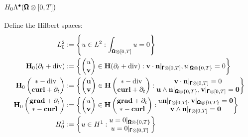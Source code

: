         \subsection*{$H_{0}\Lambda^{\bullet}(\pmb{\mathsf{\Omega}}\otimes[0, T])$}
            Define the Hilbert spaces: 
            \begin{align}
                L^{2}_{0}  &:=  \left\{u \in L^{2} : \int_{\pmb{\mathsf{\Omega}}\otimes[0, T]}u = 0\right\}  \\
                \mathbf{H}_{0}(\partial_{t} + \mathrm{div})  &:=  \left\{\begin{pmatrix} u \\ \mathbf{v} \end{pmatrix} \in \mathbf{H}(\partial_{t} + \mathrm{div}) : \mathbf{v}\cdot\mathbf{n}|_{\pmb{\mathsf{\Gamma}}\otimes[0, T]}, u|_{\pmb{\mathsf{\Omega}}\otimes\{0, T\}} = 0\right\}  \\
                \mathbf{H}_{0}\left(\begin{matrix} * - \mathrm{div} \\ \mathbf{curl} + \partial_{t} \end{matrix}\right)  &:=  \left\{\begin{pmatrix} \mathbf{u} \\ \mathbf{v} \end{pmatrix} \in \mathbf{H}\left(\begin{matrix} * - \mathrm{div} \\ \mathbf{curl} + \partial_{t} \end{matrix}\right) : \begin{matrix} \mathbf{v}\cdot\mathbf{n}|_{\pmb{\mathsf{\Gamma}}\otimes[0, T]} = 0 \\ \mathbf{u}\wedge\mathbf{n}|_{\pmb{\mathsf{\Omega}}\otimes\{0, T\}}, \mathbf{v}|_{\pmb{\mathsf{\Gamma}}\otimes[0, T]} = \mathbf{0} \end{matrix}\right\}  \\
                \mathbf{H}_{0}\left(\begin{matrix} \mathbf{grad} + \partial_{t} \\ * - \mathbf{curl} \end{matrix}\right)  &:=  \left\{\begin{pmatrix} u \\ \mathbf{v} \end{pmatrix} \in \mathbf{H}\left(\begin{matrix} \mathbf{grad} + \partial_{t} \\ * - \mathbf{curl} \end{matrix}\right) : \begin{matrix} u\mathbf{n}|_{\pmb{\mathsf{\Gamma}}\otimes[0, T]}, \mathbf{v}|_{\pmb{\mathsf{\Omega}}\otimes\{0, T\}} = \mathbf{0} \\ \mathbf{v}\wedge\mathbf{n}|_{\pmb{\mathsf{\Gamma}}\otimes[0, T]} = \mathbf{0} \end{matrix}\right\}  \\
                H^{1}_{0}  &:=  \left\{u \in H^{1} : \begin{matrix} u = 0|_{\pmb{\mathsf{\Omega}}\otimes\{0, T\}} \\ u = 0|_{\pmb{\mathsf{\Gamma}}\otimes[0, T]} \end{matrix}\right\}
            \end{align}
